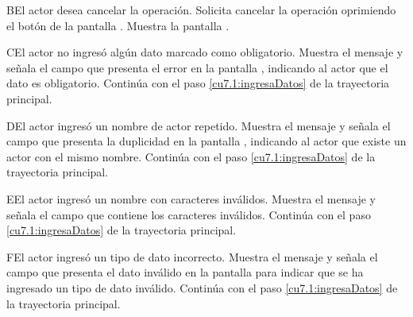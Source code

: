  \begin{UCtrayectoriaA}{B}{El actor desea cancelar la operación.}
    \UCpaso[\UCactor] Solicita cancelar la operación oprimiendo el botón  de la pantalla .
    \UCpaso[\UCsist] Muestra la pantalla .
 \end{UCtrayectoriaA}
 \begin{UCtrayectoriaA}{C}{El actor no ingresó algún dato marcado como obligatorio.}
    \UCpaso[\UCsist] Muestra el mensaje  y señala el campo que presenta el error en la pantalla 
	    , indicando al actor que el dato es obligatorio.
    \UCpaso[] Continúa con el paso \ref{cu7.1:ingresaDatos} de la trayectoria principal.
 \end{UCtrayectoriaA}
 \begin{UCtrayectoriaA}{D}{El actor ingresó un nombre de actor repetido.}
    \UCpaso[\UCsist] Muestra el mensaje  y señala el campo que presenta la duplicidad en la pantalla 
	    , indicando al actor que existe un actor con el mismo nombre.
    \UCpaso[] Continúa con el paso \ref{cu7.1:ingresaDatos} de la trayectoria principal.
 \end{UCtrayectoriaA}
 \begin{UCtrayectoriaA}{E}{El actor ingresó un nombre con caracteres inválidos.}
    \UCpaso[\UCsist] Muestra el mensaje  y señala el campo que contiene los caracteres inválidos.
    \UCpaso[] Continúa con el paso \ref{cu7.1:ingresaDatos} de la trayectoria principal.
 \end{UCtrayectoriaA}
 \begin{UCtrayectoriaA}{F}{El actor ingresó un tipo de dato incorrecto.}
    \UCpaso[\UCsist] Muestra el mensaje  y señala el campo que presenta el dato inválido en la 
    pantalla  para indicar que se ha ingresado un tipo de dato inválido.
    \UCpaso[] Continúa con el paso \ref{cu7.1:ingresaDatos} de la trayectoria principal.
 \end{UCtrayectoriaA}
